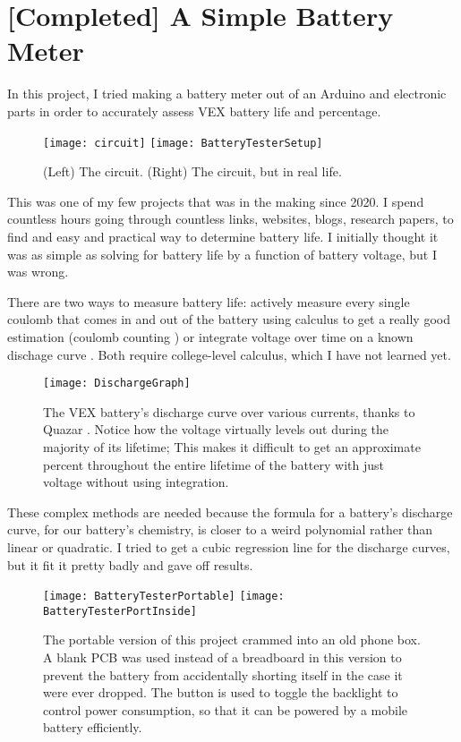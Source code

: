 \section{[Completed] A Simple Battery Meter}
In this project, I tried making a battery meter out of an Arduino and electronic parts in order to accurately assess VEX battery life and percentage.

\begin{figure}[h]
    \centering
    \texttt{[image: circuit]}
    \texttt{[image: BatteryTesterSetup]}
    \caption{
        (Left) The circuit. (Right) The circuit, but in real life.
    }
\end{figure}

This was one of my few projects that was in the making since 2020. I spend countless hours going through countless links, websites, blogs, research papers, to find and easy and practical way to determine battery life. I initially thought it was as simple as solving for battery life by a function of battery voltage, but I was wrong.

There are two ways to measure battery life: actively measure every single coulomb that comes in and out of the battery using calculus to get a really good estimation (coulomb counting \cite{CoulombCounting}) or integrate voltage over time on a known dischage curve \cite{IntegrationVoltage}. Both require college-level calculus, which I have not learned yet.

\begin{figure}[h]
    \centering
    \texttt{[image: DischargeGraph]}
    \caption{
        The VEX battery's discharge curve over various currents, thanks to Quazar \cite{Quazar}. Notice how the voltage virtually levels out during the majority of its lifetime; This makes it difficult to get an approximate percent throughout the entire lifetime of the battery with just voltage without using integration.
    }
\end{figure}

These complex methods are needed because the formula for a battery's discharge curve, for our battery's chemistry, is closer to a weird polynomial rather than linear or quadratic. I tried to get a cubic regression line for the discharge curves, but it fit it pretty badly and gave off results.

\begin{figure}[h]
    \centering
    \texttt{[image: BatteryTesterPortable]}
    \texttt{[image: BatteryTesterPortInside]}
    \caption{
        The portable version of this project crammed into an old phone box. A blank PCB was used instead of a breadboard in this version to prevent the battery from accidentally shorting itself in the case it were ever dropped. The button is used to toggle the backlight to control power consumption, so that it can be powered by a mobile battery efficiently.
    }
\end{figure}


